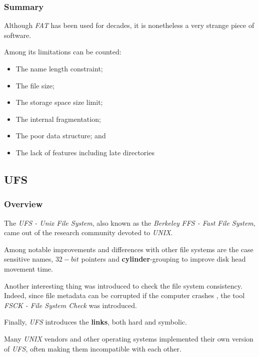 
\begin{frame}
  \frametitle{Summary}

  Although \textit{FAT} has been used for decades, it is nonetheless a
  very strange piece of software.

  \-

  Among its limitations can be counted:

  \begin{itemize}
    \item
      The name length constraint;
    \item
      The file size;
    \item
      The storage space size limit;
    \item
      The internal fragmentation;
    \item
      The poor data structure; and
    \item
      The lack of features including late directories \etc{}
  \end{itemize}
\end{frame}


\subsection{UFS}


\begin{frame}
  \frametitle{Overview}

  The \textit{UFS - Unix File System}, also known as the \textit{Berkeley}
  \textit{FFS - Fast File System}, came out of the research community devoted
  to \textit{UNIX}.

  \-

  Among notable improvements and differences with other file systems are
  the case sensitive names, $32-bit$ pointers and \textbf{cylinder}-grouping
  to improve disk head movement time.

  \-

  Another interesting thing was introduced to check the file system
  consistency. Indeed, since file metadata can be corrupted if the computer
  crashes \etc{}, the tool \textit{FSCK - File System Check} was introduced.

  \-

  Finally, \textit{UFS} introduces the \textbf{links}, both hard and symbolic.

  \-

  Many \textit{UNIX} vendors and other operating systems implemented their
  own version of \textit{UFS}, often making them incompatible with each
  other.
\end{frame}

